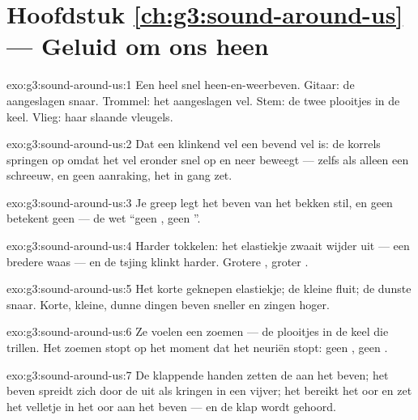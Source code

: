 \section*{Hoofdstuk \ref{ch:g3:sound-around-us} --- Geluid om ons heen}

\begin{solution}{exo:g3:sound-around-us:1}
Een heel snel heen-en-weerbeven. Gitaar: de aangeslagen snaar.
Trommel: het aangeslagen vel. Stem: de twee plooitjes in de keel.
Vlieg: haar slaande vleugels.
\end{solution}

\begin{solution}{exo:g3:sound-around-us:2}
Dat een klinkend vel een bevend vel is: de korrels springen op omdat
het vel eronder snel op en neer beweegt --- zelfs als alleen een
schreeuw, en geen aanraking, het in gang zet.
\end{solution}

\begin{solution}{exo:g3:sound-around-us:3}
Je greep legt het beven van het bekken stil, en geen 
betekent geen  --- de wet ``geen , geen ''.
\end{solution}

\begin{solution}{exo:g3:sound-around-us:4}
Harder tokkelen: het elastiekje zwaait wijder uit --- een bredere waas
--- en de tsjing klinkt harder. Grotere , groter .
\end{solution}

\begin{solution}{exo:g3:sound-around-us:5}
Het korte geknepen elastiekje; de kleine fluit; de dunste snaar.
Korte, kleine, dunne dingen beven sneller en zingen hoger.
\end{solution}

\begin{solution}{exo:g3:sound-around-us:6}
Ze voelen een zoemen --- de plooitjes in de keel die trillen. Het
zoemen stopt op het moment dat het neuriën stopt: geen
, geen .
\end{solution}

\begin{solution}{exo:g3:sound-around-us:7}
De klappende handen zetten de  aan het beven; het beven spreidt
zich door de  uit als kringen in een vijver; het bereikt het oor
en zet het velletje in het oor aan het beven --- en de klap wordt
gehoord.
\end{solution}

